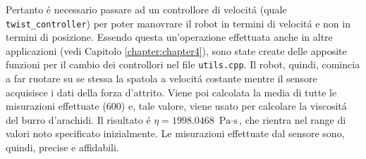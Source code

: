 Pertanto \'{e} necessario passare ad un controllore di velocit\'{a} (quale \verb|twist_controller|) per poter manovrare il robot in 
termini di velocit\'{a} e non in termini di posizione. Essendo questa un'operazione effettuata anche in altre applicazioni (vedi  
Capitolo \ref{chapter:chapter4}), sono state create delle apposite funzioni per il cambio dei controllori nel file \verb|utils.cpp|. 
Il robot, quindi, comincia a far ruotare su se stessa la spatola a velocit\'{a} costante mentre il sensore acquisisce i dati della 
forza d'attrito. 
Viene poi calcolata la media di tutte le misurazioni effettuate (600) e, tale valore, viene usato per calcolare la viscosit\'{a} 
del burro d'arachidi. 
Il risultato \'{e} $\eta = 1998.0468$ $\text{Pa} \cdot \text{s}$, che rientra nel range di valori noto specificato inizialmente. 
Le misurazioni effettuate dal sensore sono, quindi, precise e affidabili.